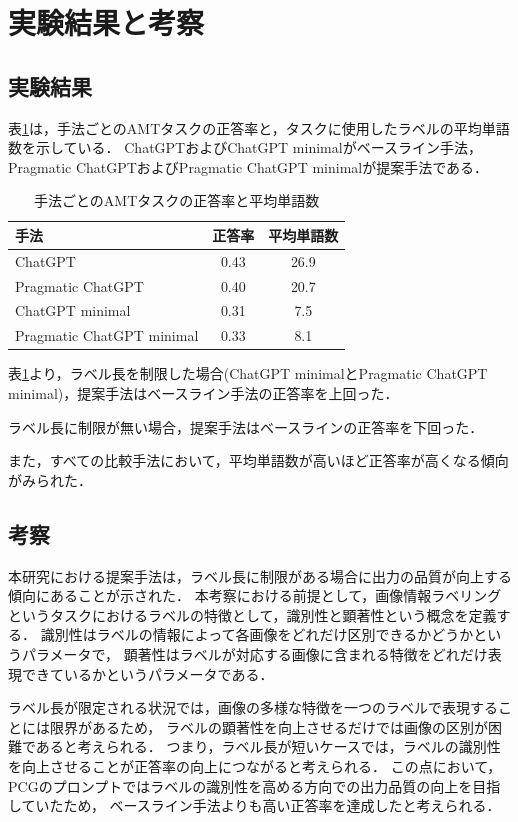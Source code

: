\documentclass[a4paper,11pt]{jreport}
\begin{document}
\section{実験結果と考察}

\subsection{実験結果}

表\ref{tab:accuracy_result}は，手法ごとのAMTタスクの正答率と，タスクに使用したラベルの平均単語数を示している．
ChatGPTおよびChatGPT minimalがベースライン手法，Pragmatic ChatGPTおよびPragmatic ChatGPT minimalが提案手法である．

\begin{table}[H]
\centering
\begin{tabular}{lcc}
\hline
手法 & 正答率 & 平均単語数 \\
\hline
ChatGPT & 0.43 & 26.9 \\
Pragmatic ChatGPT & 0.40 & 20.7 \\
ChatGPT minimal & 0.31 & 7.5 \\
Pragmatic ChatGPT minimal & 0.33 & 8.1 \\
\hline
\end{tabular}
\caption{手法ごとのAMTタスクの正答率と平均単語数}
\label{tab:accuracy_result}
\end{table}

表\ref{tab:accuracy_result}より，ラベル長を制限した場合(ChatGPT minimalとPragmatic ChatGPT minimal)，提案手法はベースライン手法の正答率を上回った．

ラベル長に制限が無い場合，提案手法はベースラインの正答率を下回った．

また，すべての比較手法において，平均単語数が高いほど正答率が高くなる傾向がみられた．

\subsection{考察}
本研究における提案手法は，ラベル長に制限がある場合に出力の品質が向上する傾向にあることが示された．
本考察における前提として，画像情報ラベリングというタスクにおけるラベルの特徴として，識別性と顕著性という概念を定義する．
識別性はラベルの情報によって各画像をどれだけ区別できるかどうかというパラメータで，
顕著性はラベルが対応する画像に含まれる特徴をどれだけ表現できているかというパラメータである．

ラベル長が限定される状況では，画像の多様な特徴を一つのラベルで表現することには限界があるため，
ラベルの顕著性を向上させるだけでは画像の区別が困難であると考えられる．
つまり，ラベル長が短いケースでは，ラベルの識別性を向上させることが正答率の向上につながると考えられる．
この点において，PCGのプロンプトではラベルの識別性を高める方向での出力品質の向上を目指していたため，
ベースライン手法よりも高い正答率を達成したと考えられる．
\end{document}
